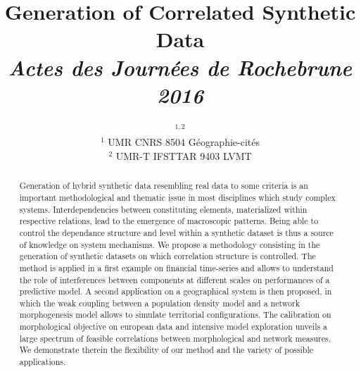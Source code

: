 


\title{\vspace{-2.5cm}Generation of Correlated Synthetic Data\\\medskip
\textit{Actes des Journées de Rochebrune 2016}
}
\author{$^{1,2}$\\
$^{1}$ UMR CNRS 8504 Géographie-cités\\
$^{2}$ UMR-T IFSTTAR 9403 LVMT
}
\date{}%


\maketitle

\justify

\vspace{-0.5cm}
\begin{abstract}
Generation of hybrid synthetic data resembling real data to some criteria is an important methodological and thematic issue in most disciplines which study complex systems. Interdependencies between constituting elements, materialized within respective relations, lead to the emergence of macroscopic patterns. Being able to control the dependance structure and level within a synthetic dataset is thus a source of knowledge on system mechanisms. We propose a methodology consisting in the generation of synthetic datasets on which correlation structure is controlled. The method is applied in a first example on financial time-series and allows to understand the role of interferences between components at different scales on performances of a predictive model. A second application on a geographical system is then proposed, in which the weak coupling between a population density model and a network morphogenesis model allows to simulate territorial configurations. The calibration on morphological objective on european data and intensive model exploration unveils a large spectrum of feasible correlations between morphological and network measures. We demonstrate therein the flexibility of our method and the variety of possible applications.

\end{abstract}
